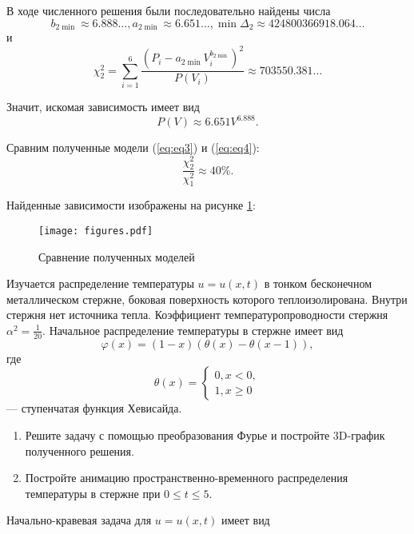 В ходе численного решения были последовательно найдены числа
\[ b_{2 \min} \approx 6.888\ldots, a_{2 \min} \approx  6.651\ldots, \min \Delta _2 \approx 424800366918.064\ldots \]
и
\[ \chi _2^2 = \sum \limits _{i=1}^6 \dfrac{(P_i - a_{2 \min} V_i^{b_{2 \min}})^2}{P(V_i)} \approx 703550.381\ldots \]

Значит, искомая зависимость имеет вид
\begin{equation} \label{eq:eq4}
P(V) \approx 6.651 V^{6.888}.
\end{equation}

Сравним полученные модели (\ref{eq:eq3}) и (\ref{eq:eq4}):
\[
\dfrac{\chi _2^2}{\chi _1^2} \approx 40\%.
\]

Найденные зависимости изображены на рисунке \ref{fig:fig-2}:

\begin{figure}[h]
\centering
\texttt{[image: figures.pdf]}
\caption{Сравнение полученных моделей}
\label{fig:fig-2}
\end{figure}

 Изучается распределение температуры $u=u(x, t)$ в тонком бесконечном металлическом стержне, боковая поверхность которого теплоизолирована. Внутри стержня нет источника тепла. Коэффициент температуропроводности стержня $\alpha^2 = \frac{1}{20}$. Начальное распределение температуры в стержне имеет вид
\[
\varphi (x)=(1-x)(\theta (x)- \theta (x-1)),
\]
где 
\[
\theta (x) =
\begin{cases}
0, x < 0,\\
1, x \ge 0
\end{cases}
\]
--- ступенчатая функция Хевисайда.\\

 \begin{enumerate}
\item Решите задачу с помощью преобразования Фурье и постройте 3D-график полученного решения.
\item Постройте анимацию пространственно-временного распределения температуры в стержне при $0 \le t \le 5$.
\end{enumerate}

Начально-кравевая задача для $u=u(x, t)$ имеет вид

